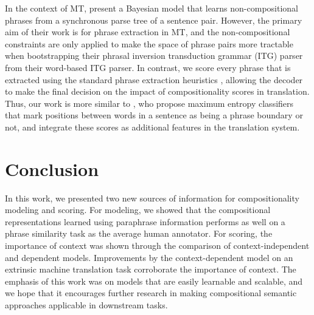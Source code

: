 \documentclass[11pt,letterpaper]{article}
\begin{document}
In the context of MT,  present a Bayesian model that learns non-compositional phrases from a synchronous parse tree of a sentence pair.
However, the primary aim of their work is for phrase extraction in MT, and the non-compositional constraints are only applied to make the space of phrase pairs more tractable when bootstrapping their phrasal inversion transduction grammar (ITG) parser from their word-based ITG parser. 
In contrast, we score every phrase that is extracted using the standard phrase extraction heuristics \cite{Chiang2007}, allowing the decoder to make the final decision on the impact of compositionality scores in translation. 
Thus, our work is more similar to , who propose maximum entropy classifiers that mark positions between words in a sentence as being a phrase boundary or not, and integrate these scores as additional features in the translation system.  

\section{Conclusion}

In this work, we presented two new sources of information for compositionality modeling and scoring. 
For modeling, we showed that the compositional representations learned using paraphrase information performs as well on a phrase similarity task as the average human annotator.
For scoring, the importance of context was shown through the comparison of context-independent and dependent models. 
Improvements by the context-dependent model on an extrinsic machine translation task corroborate the importance of context. 
The emphasis of this work was on models that are easily learnable and scalable, and we hope that it encourages further research in making compositional semantic approaches applicable in downstream tasks. 



\end{document}
